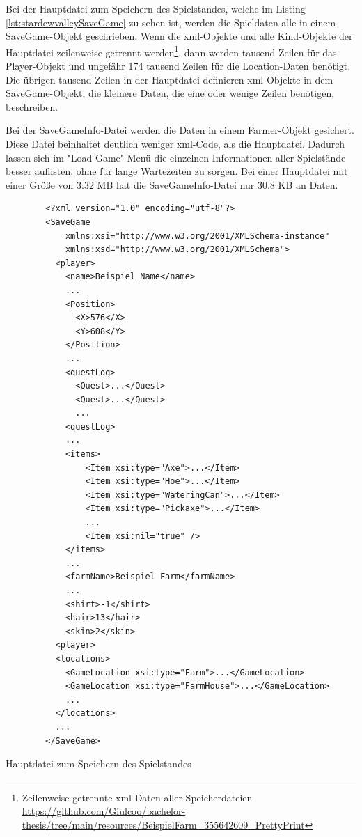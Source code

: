 Bei der Hauptdatei zum Speichern des Spielstandes, welche im Listing \ref{lst:stardewvalleySaveGame} zu sehen ist, werden die Spieldaten alle in einem SaveGame-Objekt geschrieben. Wenn die \ac{xml}-Objekte und alle Kind-Objekte der Hauptdatei zeilenweise getrennt werden\footnote{Zeilenweise getrennte \ac{xml}-Daten aller Speicherdateien \url{https://github.com/Giulcoo/bachelor-thesis/tree/main/resources/BeispielFarm_355642609_PrettyPrint}}, dann werden tausend Zeilen für das Player-Objekt und ungefähr 174 tausend Zeilen für die Location-Daten benötigt. Die übrigen tausend Zeilen in der Hauptdatei definieren \ac{xml}-Objekte in dem SaveGame-Objekt, die kleinere Daten, die eine oder wenige Zeilen benötigen, beschreiben.

Bei der SaveGameInfo-Datei werden die Daten in einem Farmer-Objekt gesichert. Diese Datei beinhaltet deutlich weniger \ac{xml}-Code, als die Hauptdatei. Dadurch lassen sich im "Load Game"-Menü die einzelnen Informationen aller Spielstände besser auflisten, ohne für lange Wartezeiten zu sorgen. Bei einer Hauptdatei mit einer Größe von 3.32 MB hat die SaveGameInfo-Datei nur 30.8 KB an Daten.

\begin{listing}[htp]
    \begin{verbatim} 
        <?xml version="1.0" encoding="utf-8"?>
        <SaveGame
            xmlns:xsi="http://www.w3.org/2001/XMLSchema-instance"
            xmlns:xsd="http://www.w3.org/2001/XMLSchema">
          <player>
            <name>Beispiel Name</name>
            ...
            <Position>
              <X>576</X>
              <Y>608</Y>
            </Position>
            ...
            <questLog>
              <Quest>...</Quest>
              <Quest>...</Quest>
              ...
            <questLog>
            ...
            <items>
                <Item xsi:type="Axe">...</Item>
                <Item xsi:type="Hoe">...</Item>
                <Item xsi:type="WateringCan">...</Item>
                <Item xsi:type="Pickaxe">...</Item>
                ...
                <Item xsi:nil="true" />
            </items>
            ...
            <farmName>Beispiel Farm</farmName>
            ...
            <shirt>-1</shirt>
            <hair>13</hair>
            <skin>2</skin>
          <player>
          <locations>
            <GameLocation xsi:type="Farm">...</GameLocation>
            <GameLocation xsi:type="FarmHouse">...</GameLocation>
            ...
          </locations>
          ...
        </SaveGame>
    \end{verbatim}
    \caption{Hauptdatei zum Speichern des Spielstandes}
    \label{lst:stardewvalleySaveGame}
\end{listing}

